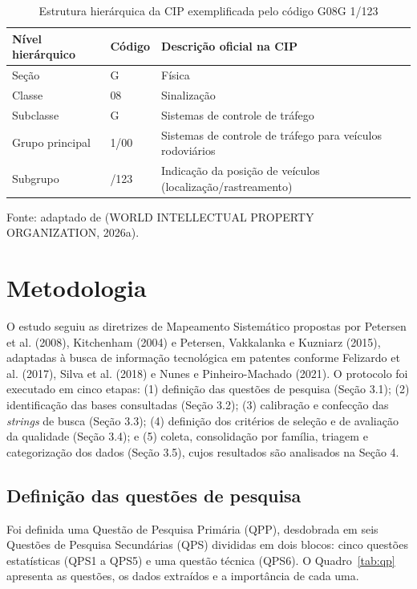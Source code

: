 \documentclass[12pt,a4paper]{article}
\begin{document}
\begin{table}[htbp]
\centering\small
\caption{Estrutura hierárquica da CIP exemplificada pelo código G08G 1/123}\label{tab:cip}
\begin{tabular}{lll}
\toprule
\textbf{Nível hierárquico} & \textbf{Código} & \textbf{Descrição oficial na CIP}\\
\midrule
Seção & G & Física\\
Classe & 08 & Sinalização\\
Subclasse & G & Sistemas de controle de tráfego\\
Grupo principal & 1/00 & Sistemas de controle de tráfego para veículos rodoviários\\
Subgrupo & /123 & Indicação da posição de veículos (localização/rastreamento)\\
\bottomrule
\end{tabular}

\smallskip
\footnotesize Fonte: adaptado de (WORLD INTELLECTUAL PROPERTY ORGANIZATION, 2026a).
\end{table}

\section{Metodologia}

O estudo seguiu as diretrizes de Mapeamento Sistemático propostas por Petersen et al. (2008), Kitchenham (2004) e Petersen, Vakkalanka e Kuzniarz (2015), adaptadas à busca de informação tecnológica em patentes conforme Felizardo et al. (2017), Silva et al. (2018) e Nunes e Pinheiro-Machado (2021). O protocolo foi executado em cinco etapas: (1) definição das questões de pesquisa (Seção 3.1); (2) identificação das bases consultadas (Seção 3.2); (3) calibração e confecção das \textit{strings} de busca (Seção 3.3); (4) definição dos critérios de seleção e de avaliação da qualidade (Seção 3.4); e (5) coleta, consolidação por família, triagem e categorização dos dados (Seção 3.5), cujos resultados são analisados na Seção 4.

\subsection{Definição das questões de pesquisa}
Foi definida uma Questão de Pesquisa Primária (QPP), desdobrada em seis Questões de Pesquisa Secundárias (QPS) divididas em dois blocos: cinco questões estatísticas (QPS1 a QPS5) e uma questão técnica (QPS6). O Quadro~\ref{tab:qp} apresenta as questões, os dados extraídos e a importância de cada uma.
\end{document}
